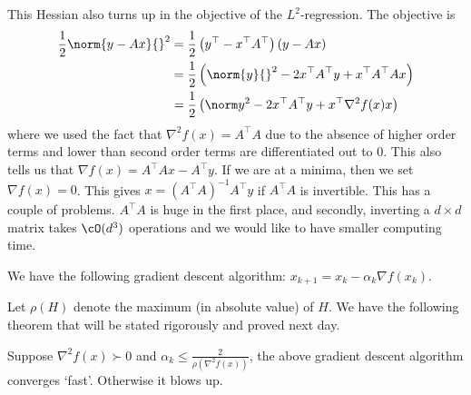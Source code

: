This Hessian also turns up in the objective of the $L^{2}$-regression. The objective is \begin{align*}
\frac12\norm{y-Ax}{}^{2} &= \frac12 \left(y^{\top}-x^{\top}A^{\top}\right)\left( y-Ax\right)\\
&= \frac12\left(\norm{y}{}^{2} - 2x^{\top}A^{\top}y  + x^{\top}A^{\top}Ax\right)\\
&=\frac12 \left(\norm y{}^{2}-2x^{\top}A^{\top}y + x^{\top}\nabla^{2}f(x)x\right)
\end{align*} where we used the fact that $\nabla^{2} f(x) = A^{\top}A$ due to the absence of higher order terms and lower than second order terms are differentiated out to $0$. This also tells us that $\nabla f(x) = A^{\top}Ax-A^{\top}y$. If we are at a minima, then we set $\nabla f(x)=0$. This gives $x=\left(A^{\top}A\right)^{-1}A^{\top}y$ if $A^{\top}A$ is invertible. This has a couple of problems. $A^{\top}A$ is huge in the first place, and secondly, inverting a $d\times d$ matrix takes $\cO(d^{3})$ operations and we would like to have smaller computing time.


We have the following gradient descent algorithm: $x_{k+1} = x_{k} - \alpha_{k} \nabla f(x_{k})$. 

Let $\rho(H)$ denote the maximum (in absolute value) of $H$. We have the following theorem that will be stated rigorously and proved next day.

\begin{thm}[informal]
Suppose $\nabla^{2}f(x)\succ 0$ and $\alpha_{k} \le \frac{2}{\rho\left(\nabla^{2}f(x)\right)}$, the above gradient descent algorithm converges `fast'. Otherwise it blows up. 
\end{thm}






























